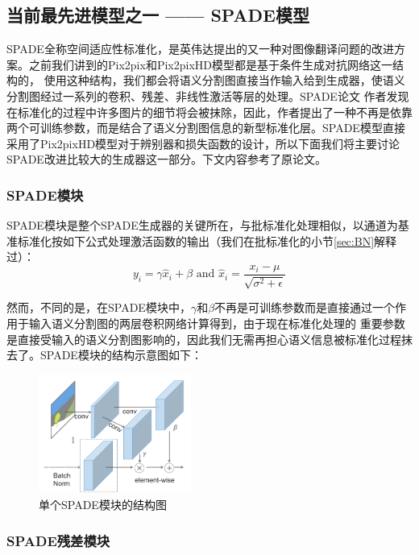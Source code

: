 \documentclass[supercite]{HustGraduPaper}
\theoremstyle{definition}
\begin{document}
\subsection{当前最先进模型之一 —— SPADE模型}

SPADE全称空间适应性标准化，是英伟达提出的又一种对图像翻译问题的改进方案。之前我们讲到的Pix2pix和Pix2pixHD模型都是基于条件生成对抗网络这一结构的，
使用这种结构，我们都会将语义分割图直接当作输入给到生成器，使语义分割图经过一系列的卷积、残差、非线性激活等层的处理。SPADE论文\cite{park2019SPADE}
作者发现在标准化的过程中许多图片的细节将会被抹除，因此，作者提出了一种不再是依靠两个可训练参数，而是结合了语义分割图信息的新型标准化层。SPADE模型直接
采用了Pix2pixHD模型对于辨别器和损失函数的设计，所以下面我们将主要讨论SPADE改进比较大的生成器这一部分。下文内容参考了原论文\cite{park2019SPADE}。

\subsubsection{SPADE模块}

SPADE模块是整个SPADE生成器的关键所在，与批标准化处理相似，以通道为基准标准化按如下公式处理激活函数的输出（我们在批标准化的小节\ref{sec:BN}解释过）：
$$y_{i}=\gamma \hat{x}_{i}+\beta \text { and } \hat{x}_{i}=\frac{x_{i}-\mu}{\sqrt{\sigma^{2}+\epsilon}}$$

然而，不同的是，在SPADE模块中，$\gamma$和$\beta$不再是可训练参数而是直接通过一个作用于输入语义分割图的两层卷积网络计算得到，由于现在标准化处理的
重要参数是直接受输入的语义分割图影响的，因此我们无需再担心语义信息被标准化过程抹去了。SPADE模块的结构示意图如下：
\begin{figure}[H]
  \begin{center}
  \includegraphics[width=5cm]{images/SPADE-Block}
  \end{center}
  \caption{单个SPADE模块的结构图}
  \label{fig:SPADE-Block}
\end{figure}

\subsubsection{SPADE残差模块}
\end{document}

